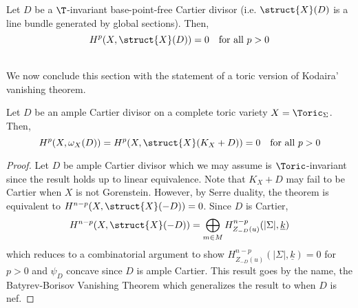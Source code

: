 \begin{theorem}
Let $D$ be a $\T$-invariant base-point-free Cartier divisor (i.e. $\struct{X}(D)$ is a line bundle generated by global sections). Then,
\[ H^p(X, \struct{X}(D)) = 0 \quad \text{for all } p > 0 \]
\end{theorem}
\noindent\\
We now conclude this section with the statement of a toric version of Kodaira' vanishing theorem.

\begin{theorem}
Let $D$ be an ample Cartier divisor on a complete toric variety $X = \Toric_\Sigma$. Then,
\[ H^p(X, \omega_X(D)) = H^p(X, \struct{X}(K_X + D)) = 0 \quad \text{for all } p > 0 \]
\end{theorem}

\begin{proof}
Let $D$ be ample Cartier divisor which we may assume is $\Toric$-invariant since the result holds up to linear equivalence. Note that $K_X + D$ may fail to be Cartier when $X$ is not Gorenstein. However, by Serre duality, the theorem is equivalent to $H^{n-p}(X, \struct{X}(-D)) = 0$. Since $D$ is Cartier,
\[ H^{n-p}(X, \struct{X}(-D)) = \bigoplus_{m \in M} H^{n-p}_{Z_{-D}(u)}(|\Sigma|, \underline{k}) \]
which reduces to a combinatorial argument to show $H^{n-p}_{Z_{-D}(u)}(|\Sigma|, \underline{k}) = 0$ for $p > 0$ and $\psi_D$ concave since $D$ is ample Cartier. This result goes by the name, the Batyrev-Borisov Vanishing Theorem \cite[Thm. 92.7]{cox} which generalizes the result to when $D$ is nef. 
\end{proof}

